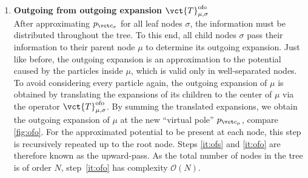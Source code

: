 \begin{enumerate}
  \item \textbf{Outgoing from outgoing expansion $\vct{T}_{\mu,\sigma}^{\mathrm{ofo}}$}
    \\
    After approximating $p_{\vct c_\sigma}$ for all leaf nodes $\sigma$, the information must be distributed throughout the tree.
    To this end, all child nodes $\sigma$ pass their information to their parent node $\mu$ to determine its outgoing expansion.
    Just like before, the outgoing expansion is an approximation to the potential caused by the particles inside $\mu$, which is valid only in well-separated nodes.
    To avoid considering every particle again, the outgoing expansion of $\mu$ is obtained by translating the expansions of its children to the center of $\mu$ via the operator $\vct{T}_{\mu,\sigma}^{\mathrm{ofo}}$.
    By summing the translated expansions, we obtain the outgoing expansion of $\mu$ at the new ``virtual pole'' $p_{\vct c_\mu}$, compare \cref{fig:ofo}.
    For the approximated potential to be present at each node, this step is recursively repeated up to the root node.
    Steps \ref{it:ofs} and \ref{it:ofo} are therefore known as the upward-pass.
    As the total number of nodes in the tree is of order $N$, step~\ref{it:ofo} has complexity $\mathcal{O}(N)$.

    \begin{figure}
      \centering
      \null\hfill{}
      \hfill{}
\end{figure}
\end{enumerate}
